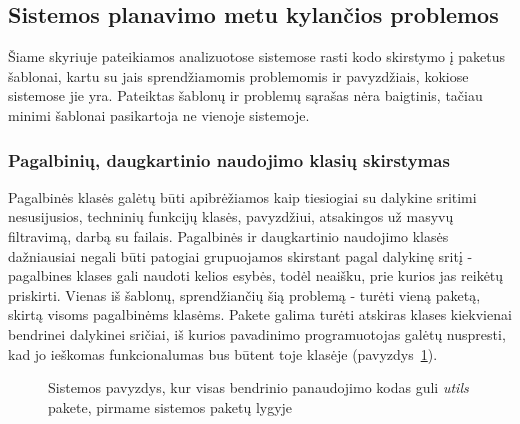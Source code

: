 \subsection{Sistemos planavimo metu kylančios problemos}
Šiame skyriuje pateikiamos analizuotose sistemose rasti kodo skirstymo į paketus šablonai, kartu su jais sprendžiamomis problemomis ir pavyzdžiais,
kokiose sistemose jie yra.
Pateiktas šablonų ir problemų sąrašas nėra baigtinis, tačiau minimi šablonai pasikartoja ne vienoje sistemoje.

\subsubsection{Pagalbinių, daugkartinio naudojimo klasių skirstymas}
Pagalbinės klasės galėtų būti apibrėžiamos kaip tiesiogiai su dalykine sritimi nesusijusios, techninių funkcijų klasės,
pavyzdžiui, atsakingos už masyvų filtravimą, darbą su failais.
Pagalbinės ir daugkartinio naudojimo klasės dažniausiai negali būti patogiai grupuojamos skirstant pagal dalykinę sritį - pagalbines klases gali
naudoti kelios esybės, todėl neaišku, prie kurios jas reikėtų priskirti.
Vienas iš šablonų, sprendžiančių šią problemą - turėti vieną paketą, skirtą visoms pagalbinėms klasėms.
Pakete galima turėti atskiras klases kiekvienai bendrinei dalykinei sričiai, iš kurios pavadinimo programuotojas galėtų nuspresti,
kad jo ieškomas funkcionalumas bus būtent toje klasėje (pavyzdys~\ref{fig:utils}).
\begin{figure}[H]
\snugshade
{}
\endsnugshade
\caption{Sistemos pavyzdys, kur visas bendrinio panaudojimo kodas guli \textit{utils} pakete, pirmame sistemos paketų lygyje}
\label{fig:utils}
\end{figure}

